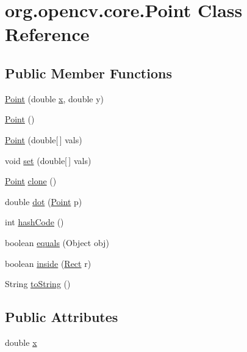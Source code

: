 \hypertarget{classorg_1_1opencv_1_1core_1_1_point}{}\section{org.\+opencv.\+core.\+Point Class Reference}
\label{classorg_1_1opencv_1_1core_1_1_point}
\subsection*{Public Member Functions}
\begin{DoxyCompactItemize}
\item 
\mbox{\hyperlink{classorg_1_1opencv_1_1core_1_1_point_a731a3ab474d4de8bf0e339d41b0cca30}{Point}} (double \mbox{\hyperlink{classorg_1_1opencv_1_1core_1_1_point_a90cf386f2b7c3a60e0378f94dcdd252c}{x}}, double y)
\item 
\mbox{\hyperlink{classorg_1_1opencv_1_1core_1_1_point_a7925461039e078b158a9143605aea0eb}{Point}} ()
\item 
\mbox{\hyperlink{classorg_1_1opencv_1_1core_1_1_point_a3f6c78dc7bedd5769748179e863d336e}{Point}} (double\mbox{[}$\,$\mbox{]} vals)
\item 
void \mbox{\hyperlink{classorg_1_1opencv_1_1core_1_1_point_aee7038884db6b7d0e8d0026836c8a286}{set}} (double\mbox{[}$\,$\mbox{]} vals)
\item 
\mbox{\hyperlink{classorg_1_1opencv_1_1core_1_1_point}{Point}} \mbox{\hyperlink{classorg_1_1opencv_1_1core_1_1_point_ab639c60b6eeb3510655fe352cca84205}{clone}} ()
\item 
double \mbox{\hyperlink{classorg_1_1opencv_1_1core_1_1_point_ac048a9b96927ce34a9e23decbebb066c}{dot}} (\mbox{\hyperlink{classorg_1_1opencv_1_1core_1_1_point}{Point}} p)
\item 
int \mbox{\hyperlink{classorg_1_1opencv_1_1core_1_1_point_a6d99db5e91f0741c3be42f2a72671e94}{hash\+Code}} ()
\item 
boolean \mbox{\hyperlink{classorg_1_1opencv_1_1core_1_1_point_a483d4fd809068ae5440953b8822d5002}{equals}} (Object obj)
\item 
boolean \mbox{\hyperlink{classorg_1_1opencv_1_1core_1_1_point_abeb829c3f639aff6d322f4d83723f899}{inside}} (\mbox{\hyperlink{classorg_1_1opencv_1_1core_1_1_rect}{Rect}} r)
\item 
String \mbox{\hyperlink{classorg_1_1opencv_1_1core_1_1_point_ac99f88cb353d8f6e47f28bd444cf9dec}{to\+String}} ()
\end{DoxyCompactItemize}
\subsection*{Public Attributes}
\begin{DoxyCompactItemize}
\item 
double \mbox{\hyperlink{classorg_1_1opencv_1_1core_1_1_point_a90cf386f2b7c3a60e0378f94dcdd252c}{x}}
\end{DoxyCompactItemize}



